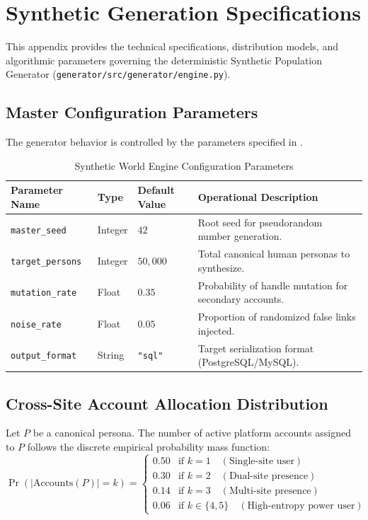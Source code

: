 \chapter{Synthetic Generation Specifications}
\label{app:synthetic-generator}

This appendix provides the technical specifications, distribution models, and algorithmic parameters governing the deterministic Synthetic Population Generator (\texttt{generator/src/generator/engine.py}).

\section{Master Configuration Parameters}
The generator behavior is controlled by the parameters specified in .

\begin{table}[htbp]
\centering
\small
\caption{Synthetic World Engine Configuration Parameters}
\label{tab:generator-config}
\begin{tabular}{@{}lllp{5.5cm}@{}}
\toprule
\textbf{Parameter Name} & \textbf{Type} & \textbf{Default Value} & \textbf{Operational Description} \\ \midrule
\texttt{master\_seed} & Integer & $42$ & Root seed for pseudorandom number generation. \\ \addlinespace
\texttt{target\_persons} & Integer & $50{,}000$ & Total canonical human personas to synthesize. \\ \addlinespace
\texttt{mutation\_rate} & Float & $0.35$ & Probability of handle mutation for secondary accounts. \\ \addlinespace
\texttt{noise\_rate} & Float & $0.05$ & Proportion of randomized false links injected. \\ \addlinespace
\texttt{output\_format} & String & \texttt{"sql"} & Target serialization format (PostgreSQL/MySQL). \\ \bottomrule
\end{tabular}
\end{table}

\section{Cross-Site Account Allocation Distribution}
Let $P$ be a canonical persona. The number of active platform accounts assigned to $P$ follows the discrete empirical probability mass function:
\begin{equation}
\label{eq:account-distribution}
\Pr(|\text{Accounts}(P)| = k) = \begin{cases}
0.50 & \text{if } k = 1 \quad (\text{Single-site user}) \\
0.30 & \text{if } k = 2 \quad (\text{Dual-site presence}) \\
0.14 & \text{if } k = 3 \quad (\text{Multi-site presence}) \\
0.06 & \text{if } k \in \{4, 5\} \quad (\text{High-entropy power user})
\end{cases}
\end{equation}

